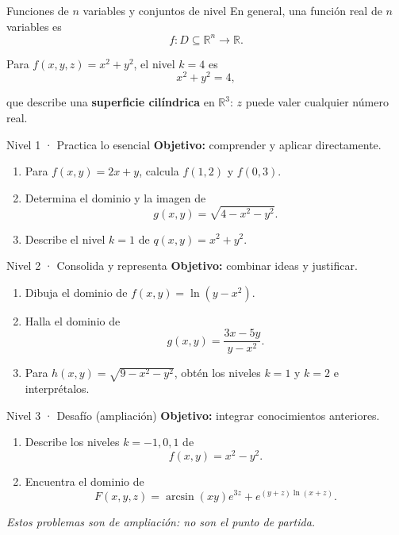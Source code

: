 \documentclass[main.tex]{subfiles}
\begin{document}
\begin{frame}{Funciones de $n$ variables y conjuntos de nivel}
En general, una función real de $n$ variables es
\[
f:D\subseteq\mathbb R^n\longrightarrow\mathbb R.
\]
\medskip

Para $f(x,y,z)=x^2+y^2$, el nivel $k=4$ es
\[
x^2+y^2=4,
\]
\vspace{-1mm}

que describe una \textbf{superficie cilíndrica} en $\mathbb R^3$: $z$ puede valer cualquier número real.
\end{frame}

\begin{frame}{Nivel 1 · Practica lo esencial}
\textbf{Objetivo:} comprender y aplicar directamente.
\medskip
\begin{enumerate}
\item Para $f(x,y)=2x+y$, calcula $f(1,2)$ y $f(0,3)$.
\medskip
\item Determina el dominio y la imagen de
\[
g(x,y)=\sqrt{4-x^2-y^2}.
\]
\item Describe el nivel $k=1$ de $q(x,y)=x^2+y^2$.
\end{enumerate}
\end{frame}

\begin{frame}{Nivel 2 · Consolida y representa}
\textbf{Objetivo:} combinar ideas y justificar.
\medskip
\begin{enumerate}
\item Dibuja el dominio de $f(x,y)=\ln(y-x^2)$.
\medskip
\item Halla el dominio de
\[
g(x,y)=\frac{3x-5y}{y-x^2}.
\]
\item Para $h(x,y)=\sqrt{9-x^2-y^2}$, obtén los niveles $k=1$ y $k=2$ e interprétalos.
\end{enumerate}
\end{frame}

\begin{frame}{Nivel 3 · Desafío (ampliación)}
\textbf{Objetivo:} integrar conocimientos anteriores.
\medskip
\begin{enumerate}
\item Describe los niveles $k=-1,0,1$ de
\[
f(x,y)=x^2-y^2.
\]
\item Encuentra el dominio de
\[
F(x,y,z)=\arcsin(xy)e^{3z}+e^{(y+z)\ln(x+z)}.
\]
\end{enumerate}
\smallskip
\textit{Estos problemas son de ampliación: no son el punto de partida.}
\end{frame}
\end{document}
